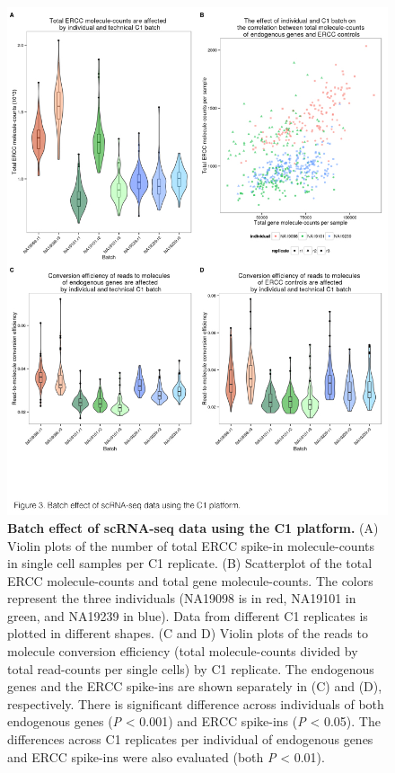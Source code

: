 \begin{figure}[htbp]
\centering
\includegraphics[trim=0 .5in 0 0,clip,width=5in]{img/ch04/Figure03.jpeg}
\caption[Batch effect of scRNA-seq data using the C1
platform.]{\textbf{Batch effect of scRNA-seq data using the C1
platform.} (A) Violin plots of the number of total ERCC spike-in
molecule-counts in single cell samples per C1 replicate. (B) Scatterplot
of the total ERCC molecule-counts and total gene molecule-counts. The
colors represent the three individuals (NA19098 is in red, NA19101 in
green, and NA19239 in blue). Data from different C1 replicates is
plotted in different shapes. (C and D) Violin plots of the reads to
molecule conversion efficiency (total molecule-counts divided by total
read-counts per single cells) by C1 replicate. The endogenous genes and
the ERCC spike-ins are shown separately in (C) and (D), respectively.
There is significant difference across individuals of both endogenous
genes (\emph{P} \textless{} 0.001) and ERCC spike-ins (\emph{P}
\textless{} 0.05). The differences across C1 replicates per individual
of endogenous genes and ERCC spike-ins were also evaluated (both
\emph{P} \textless{} 0.01).}
\label{fig:batch}
\end{figure}

